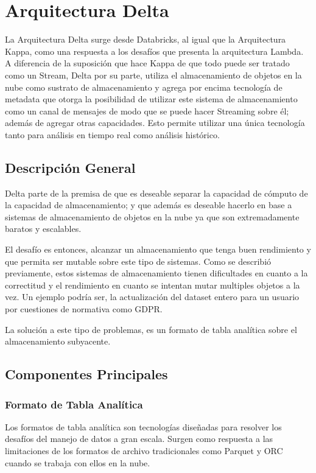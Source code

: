 \section{Arquitectura Delta}


La Arquitectura Delta surge desde Databricks, al igual que la Arquitectura Kappa, 
como una respuesta a los desafíos que presenta la arquitectura Lambda.
A diferencia de la suposición que hace Kappa de que todo puede ser tratado como un Stream, 
Delta por su parte, utiliza el almacenamiento de objetos en la nube como sustrato de almacenamiento y 
agrega por encima tecnología de metadata que otorga la posibilidad de utilizar este sistema de almacenamiento
como un canal de mensajes de modo que se puede hacer Streaming sobre él; además de agregar otras capacidades.
Esto permite utilizar una única tecnología tanto para análisis en tiempo real como análisis histórico. 


\subsection{Descripción General}

Delta parte de la premisa de que es deseable separar la capacidad de cómputo de la capacidad de almacenamiento; 
y que además es deseable hacerlo en base a sistemas de almacenamiento de objetos en la nube ya que son extremadamente
baratos y escalables. 

El desafío es entonces, alcanzar un almacenamiento que tenga buen rendimiento y que permita ser mutable sobre
este tipo de sistemas. Como se describió previamente, estos sistemas de almacenamiento tienen dificultades
en cuanto a la correctitud y el rendimiento en cuanto se intentan mutar multiples objetos a la vez. Un ejemplo
podría ser, la actualización del dataset entero para un usuario por cuestiones de normativa como GDPR.

La solución a este tipo de problemas, es un formato de tabla analítica sobre el almacenamiento subyacente. 

\newpage
\subsection{Componentes Principales}

\subsubsection{Formato de Tabla Analítica}

Los formatos de tabla analítica son tecnologías diseñadas para resolver los desafíos del manejo de datos
a gran escala. Surgen como respuesta a las limitaciones de los formatos de archivo tradicionales como Parquet y ORC
cuando se trabaja con ellos en la nube. 

